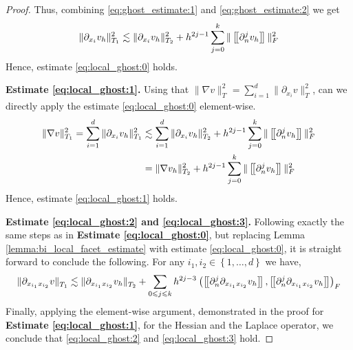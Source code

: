 \begin{proof}
Thus, combining \eqref{eq:ghost_estimate:1} and \eqref{eq:ghost_estimate:2} we get
\begin{equation}
    \| \partial _{x_{i}} v_{h} \|_{  T_{1}}^{2  }  \lesssim \| \partial _{x_{i}} v_{h} \|_{ T_{2} }^{  2} + h^{2j-1}\sum_{j=0}^{k} \| \left[\!\left[  \partial _{n}^{j} v_{h}  \right]\!\right]   \|_{F  }^{2  } \\
\end{equation}
        Hence, estimate \eqref{eq:local_ghost:0} holds.

        \textbf{Estimate \eqref{eq:local_ghost:1}.} Using that $\| \nabla  v \|_{T_{}  }^{ 2 } =  \sum_{i=1}^{d} \|  \partial _{x_{i}} v  \|_{T_{}  }^{ 2 }$, can we directly apply the estimate \eqref{eq:local_ghost:0} element-wise.
        \begin{equation}
            \begin{split}
\| \nabla v \|_{T_{1}  }^{2  } = \sum_{i=1}^{d} \| \partial _{x_{i}}  v_{h} \|_{ T_{1} }^{  2} & \lesssim  \sum_{i=1}^{d} \| \partial _{x_{i}}  v_{h} \|_{ T_{2} }^{  2} + h^{2j-1}\sum_{j=0}^{k} \| \left[\!\left[  \partial _{n}^{j} v_{h}  \right]\!\right]   \|_{F  }^{2  }  \\
         &  = \| \nabla  v_{h} \|_{ T_{2} }^{  2} + h^{2j-1}\sum_{j=0}^{k} \| \left[\!\left[  \partial _{n}^{j} v_{h}  \right]\!\right]   \|_{F  }^{2  }
            \end{split}
        \end{equation}
        Hence, estimate \eqref{eq:local_ghost:1} holds.


\textbf{Estimate \eqref{eq:local_ghost:2} and \eqref{eq:local_ghost:3}.}
Following exactly the same steps as in \textbf{Estimate \eqref{eq:local_ghost:0}}, but replacing Lemma \ref{lemma:bi_local_facet_estimate} with estimate \eqref{eq:local_ghost:0}, it is straight forward to conclude the following. For any  $i_{1},i_{2} \in
\left\{ 1,\ldots, d \right\}$ we have,
\begin{equation}
    \| \partial _{x_{i_1} x_{i_2}} v \|_{ T_{1} }^{  }  \lesssim \| \partial_{ x_{i_1} x_{i_2} } v_{h} \|_{ T_{2} }^{  } + \sum_{0\leqslant j\leqslant k}  {h^{2j -3}}^{} \left(  \left[\!\left[  \partial _{n}^{j} \partial _{x_{i_1} x_{i_2}} v_{h}  \right]\!\right], \left[\!\left[  \partial ^{j}_{n}
        \partial _{x_{i_1} x_{i_2}} v_{h}  \right]\!\right] \right)     _{F}
\end{equation}
Finally, applying the element-wise argument, demonstrated in the proof for \textbf{Estimate \eqref{eq:local_ghost:1}}, for the Hessian and the Laplace operator, we conclude that \eqref{eq:local_ghost:2} and \eqref{eq:local_ghost:3} hold.

\end{proof}



